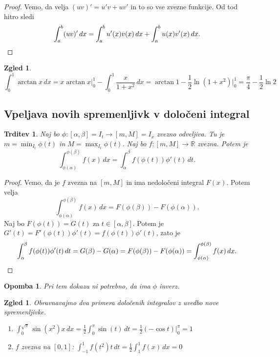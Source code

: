\documentclass[10pt, a4paper]{article}
\newtheorem{trditev}[izr]{Trditev}
\newtheorem*{opomba}{Opomba}
\newtheorem{zgled}[izr]{Zgled}
\newenvironment{noticeC}{%
  \tcolorbox[%
  notitle,
  empty,
  enhanced,  %
  breakable,
  coltext=black, 
  fontupper=\rmfamily,
  noparskip,
  sharp corners,
  boxrule=-1pt,  %
  frame hidden,
  left=7pt,  %
  right=7pt,
  top=5pt,
  bottom=5pt,
  before skip=2.5ex plus 2pt,
  after skip=2.5ex plus 2pt,
  overlay unbroken and last={%
  },
  ]}
{\endtcolorbox}
\newenvironment{dokaz}%
  {\begin{noticeC}\begin{proof}}%
  {\end{proof}\end{noticeC}}
\newcommand{\R}{\mathbb {R}}
\begin{document}
\begin{dokaz}
    Vemo, da velja $(uv)' = u'v + uv'$ in to so vse zvezne funkcije. Od tod hitro sledi 
    \begin{equation*}
        \int_a ^b (uv)'\,dx = \int_a ^b u'(x) v(x)\,dx + \int_a ^b u(x) v'(x)\,dx. \qedhere
    \end{equation*}
\end{dokaz}

\begin{zgled}
    $$\int_0 ^1 \arctan x\,dx = x \arctan x \Big|_0 ^1 - \int_0 ^1 \frac{x}{1 + x^2}\,dx = \arctan 1 - \frac{1}{2} \ln (1 + x^2) \Big|_0 ^1 = \frac{\pi}{4} - \frac{1}{2} \ln 2$$
\end{zgled}

\subsection{Vpeljava novih spremenljivk v določeni integral}

\begin{trditev}
    Naj bo $\phi: [\alpha, \beta] = I_t \rightarrow [m, M] = I_x$ zvezno odveljiva.
    Tu je $m = \min_{I_t} \phi(t)$ in $M = \max_{I_t} \phi(t)$.
    Naj bo $f: [m, M] \rightarrow \R$ zvezna. Potem je 
    $$\int_{\phi(\alpha)} ^{\phi(\beta)} f(x)\,dx = \int_\alpha ^\beta f(\phi(t)) \phi'(t)\,dt.$$
\end{trditev}

\begin{dokaz}
    Vemo, da je $f$ zvezna na $[m, M]$ in ima nedoločeni integral $F(x)$.
    Potem velja
    $$\int_{\phi(\alpha)} ^{\phi(\beta)} f(x)\,dx = F(\phi(\beta)) - F(\phi(\alpha)).$$
    Naj bo $F(\phi(t)) = G(t)$ za $t \in [\alpha, \beta]$.
    Potem je $G'(t) = F'(\phi(t)) \phi'(t) = f(\phi(t)) \phi'(t)$, zato je
    \begin{equation*}
        \int_\alpha ^\beta f(\phi(t)) \phi'(t)\,dt = G(\beta) - G(\alpha) = F(\phi(\beta)) - F(\phi(\alpha)) = \int_{\phi(\alpha)} ^{\phi(\beta)} f(x)\,dx. \qedhere
    \end{equation*}
\end{dokaz}

\begin{opomba}
    Pri tem dokazu ni potrebno, da ima $\phi$ inverz.
\end{opomba}

\begin{zgled}
    Obravnavajmo dva primera določenih integralov z uvedbo nove spremenljivke.
    \begin{enumerate}
        \item $\int_0 ^{\sqrt{\pi}} \sin (x^2) x\,dx = \frac{1}{2} \int_0 ^{\pi} \sin (t)\,dt = \frac{1}{2} (- \cos t) \Big|_0 ^{\pi} = 1$
        \item $f$ zvezna na $[0, 1]$: $\int_{-1} ^1 f(t^2) t\,dt = \frac{1}{2} \int_1 ^1 f(x)\,dx = 0$
    \end{enumerate}
\end{zgled}
\end{document}
